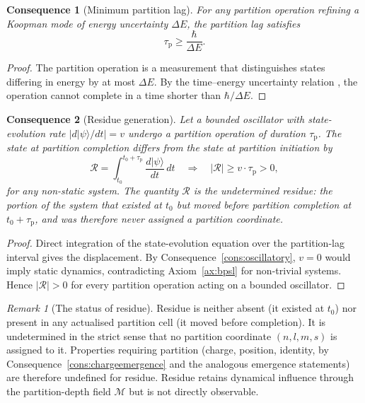 \documentclass[11pt,twocolumn,a4paper]{article}
\theoremstyle{axiomstyle}
\theoremstyle{conseqstyle}
\newtheorem{consequence}{Consequence}
\theoremstyle{definition}
\theoremstyle{remark}
\newtheorem*{remark}{Remark}
\newcommand{\Depth}{\mathcal{M}}
\newcommand{\taup}{\tau_{\mathrm{p}}}
\newcommand{\Residue}{\mathcal{R}}
\begin{document}
\begin{consequence}[Minimum partition lag]\label{cons:minlag}
For any partition operation refining a Koopman mode of energy uncertainty $\Delta E$, the partition lag satisfies
\begin{equation}
\taup \geq \frac{\hbar}{\Delta E}.
\end{equation}
\end{consequence}

\begin{proof}
The partition operation is a measurement that distinguishes states differing in energy by at most $\Delta E$. By the time--energy uncertainty relation \citep{landaulifshitz1}, the operation cannot complete in a time shorter than $\hbar/\Delta E$.
\end{proof}

\begin{consequence}[Residue generation]\label{cons:residuegen}
Let a bounded oscillator with state-evolution rate $|d|\psi\rangle/dt|=v$ undergo a partition operation of duration $\taup$. The state at partition completion differs from the state at partition initiation by
\begin{equation}
\Residue=\int_{t_0}^{t_0+\taup}\frac{d|\psi\rangle}{dt}\,dt\quad\Longrightarrow\quad |\Residue|\geq v\cdot\taup>0,
\end{equation}
for any non-static system. The quantity $\Residue$ is the \emph{undetermined residue}: the portion of the system that existed at $t_0$ but moved before partition completion at $t_0+\taup$, and was therefore never assigned a partition coordinate.
\end{consequence}

\begin{proof}
Direct integration of the state-evolution equation over the partition-lag interval gives the displacement. By Consequence~\ref{cons:oscillatory}, $v=0$ would imply static dynamics, contradicting Axiom~\ref{ax:bpsl} for non-trivial systems. Hence $|\Residue|>0$ for every partition operation acting on a bounded oscillator.
\end{proof}

\begin{remark}[The status of residue]
Residue is neither absent (it existed at $t_0$) nor present in any actualised partition cell (it moved before completion). It is undetermined in the strict sense that no partition coordinate $(n,l,m,s)$ is assigned to it. Properties requiring partition (charge, position, identity, by Consequence~\ref{cons:chargeemergence} and the analogous emergence statements) are therefore undefined for residue. Residue retains dynamical influence through the partition-depth field $\Depth$ but is not directly observable.
\end{remark}
\end{document}

